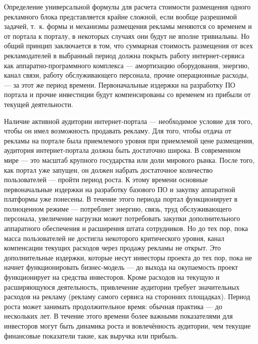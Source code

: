 \documentclass{article}
\begin{document}
Определение универсальной формулы для расчета стоимости размещения одного рекламного блока представляется крайне сложной, если вообще разрешимой задачей, т.~к. формы и механизмы размещения рекламы меняются со временем и от портала к порталу, в некоторых случаях они будут не вполне тривиальны. Но общий принцип заключается в том, что суммарная стоимость размещения от всех рекламодателей в выбранный период должна покрыть работу интернет-сервиса как аппаратно-программного комплекса — амортизацию оборудования, энергию, канал связи, работу обслуживающего персонала, прочие операционные расходы, — за этот же период времени. Первоначальные издержки на разработку ПО портала и прочие инвестиции будут компенсированы со временем из прибыли от текущей деятельности.

Наличие активной аудитории интернет-портала — необходимое условие для того, чтобы он имел возможность продавать рекламу. Для того, чтобы отдача от рекламы на портале была приемлемого уровня при приемлемой цене размещения, аудитория интернет-портала должна быть достаточно широка. В современном мире — это масштаб крупного государства или доли мирового рынка. После того, как портал уже запущен, он должен набрать достаточное количество пользователей — пройти период роста. К этому времени основные первоначальные издержки на разработку базового ПО и закупку аппаратной платформы уже понесены. В течение этого периода портал функционирует в полноценном режиме — потребляет энергию, связь, труд обслуживающего персонала, увеличение нагрузки может потребовать закупки дополнительного аппаратного обеспечения и расширения штата сотрудников. Но до тех пор, пока масса пользователей не достигла некоторого критического уровня, канал компенсации текущих расходов через продажу рекламы не открыт. Это дополнительные издержки, которые несут инвесторы проекта до тех пор, пока не начнет функционировать бизнес-модель — до выхода на окупаемость проект функционирует на средства инвесторов. Кроме расходов на текущую и расширяющуюся деятельность, привлечение аудитории требует значительных расходов на рекламу (рекламу самого сервиса на сторонних площадках). Период роста может занимать продолжительное время: обычная практика — до нескольких лет. В течение этого времени более важными показателями для инвесторов могут быть динамика роста и вовлечённость аудитории, чем текущие финансовые показатели такие, как выручка или прибыль.
\end{document}
